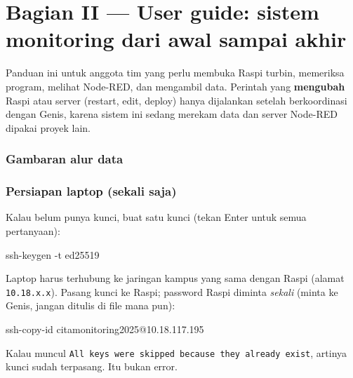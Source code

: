 \documentclass[10.5pt,a4paper]{article}
\newcommand{\cmd}[1]{\texttt{#1}}
\begin{document}
\clearpage
\part*{Bagian II --- User guide: sistem monitoring dari awal sampai akhir}

Panduan ini untuk anggota tim yang perlu membuka Raspi turbin, memeriksa program, melihat Node-RED, dan mengambil data.
Perintah yang \textbf{mengubah} Raspi atau server (restart, edit, deploy) hanya dijalankan setelah berkoordinasi dengan Genis,
karena sistem ini sedang merekam data dan server Node-RED dipakai proyek lain.

\section{Gambaran alur data}
\begin{center}
\end{center}

\section{Persiapan laptop (sekali saja)}
\begin{langkah}
Kalau belum punya kunci, buat satu kunci (tekan Enter untuk semua pertanyaan):
\begin{terminal}
ssh-keygen -t ed25519
\end{terminal}
Laptop harus terhubung ke jaringan kampus yang sama dengan Raspi (alamat \cmd{10.18.x.x}). Pasang kunci ke Raspi; password Raspi diminta \emph{sekali} (minta ke Genis, jangan ditulis di file mana pun):
\begin{terminal}
ssh-copy-id citamonitoring2025@10.18.117.195
\end{terminal}
Kalau muncul \cmd{All keys were skipped because they already exist}, artinya kunci sudah terpasang. Itu bukan error.
\end{langkah}
\end{document}
